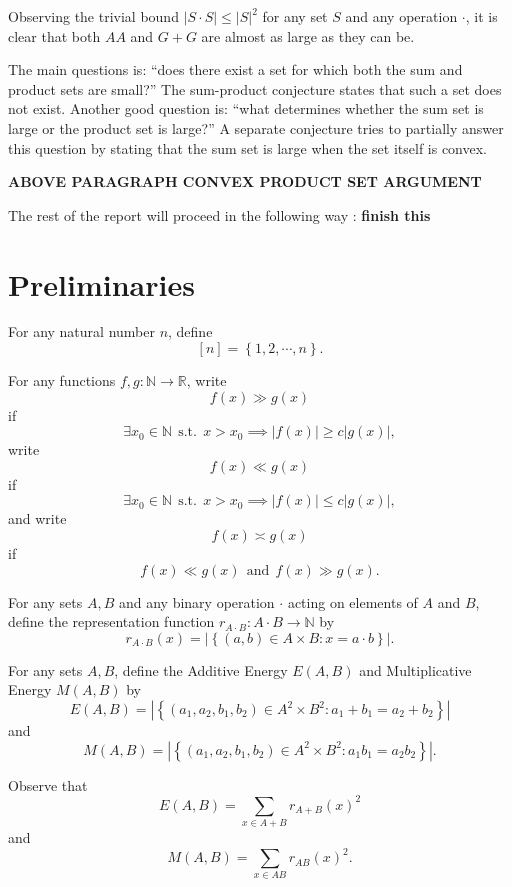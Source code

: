 \documentclass[12pt]{amsart}
\begin{document}
Observing the trivial bound \(\left\lvert S \cdot S \right\rvert \leq \left\lvert S \right\rvert ^{2}\) for any set \(S\) and any
operation \(\cdot \), it is clear that both \(AA\) and \(G +G\) are almost as large as they can be.

The main questions is: ``does there exist a set for which both the sum and product sets are small?''
The sum-product conjecture states that such a set does not exist. Another good question is: ``what
determines whether the sum set is large or the product set is large?'' A separate
conjecture tries to partially answer this question by stating that the sum set is large
when the set itself is convex.

\textbf{ABOVE PARAGRAPH CONVEX PRODUCT SET ARGUMENT}

The rest of the report will proceed in the following way : \textbf{finish this}

\section{Preliminaries}

For any natural number \(n\), define
\[
    [n] = \left\{ 1, 2 , \cdots , n \right\} 
.\]

For any functions \(f,g: \mathbb{N}  \to \mathbb{R} \), write
\[
    f(x) \gg g(x) 
\]
if
\[
    \exists x_0 \in \mathbb{N} ~~\text{s.t.}~~ x > x_0 \implies \left\lvert f(x) \right\rvert \geq c \left\lvert g(x) \right\rvert  
,\]
write
\[
    f(x) \ll g(x) 
\]
if
\[
    \exists x_0 \in \mathbb{N} ~~\text{s.t.}~~ x > x_0 \implies \left\lvert f(x) \right\rvert \leq c \left\lvert g(x) \right\rvert 
,\]
and write
\[
    f(x) \asymp g(x)
\]
if
\[
    f(x) \ll g(x) ~ ~ \text{and} ~ ~ f(x) \gg g(x)
.\]

For any sets \(A,B\) and any binary operation \(\cdot \) acting on elements of \(A\) and \(B\), define the representation function
\(r_{A \cdot B} : A \cdot B \to \mathbb{N} \) by
\[
    r_{A \cdot B} (x) = \left\lvert \left\{ (a,b)\in  A \times B : x = a \cdot b \right\}  \right\rvert
.\]

For any sets \(A,B\), define the Additive Energy \(E(A,B)\) and Multiplicative Energy \(M(A,B)\) by
\[
    E(A,B) = \left\lvert \left\{ (a_1,a_2,b_1,b_2) \in A^{2} \times B^{2} : a_1 + b_1 = a_2 + b_2 \right\}  \right\rvert 
\]
and
\[
    M(A,B) = \left\lvert \left\{ (a_1,a_2,b_1,b_2)\in  A^{2} \times B^{2} : a_1b_1 = a_2b_2 \right\}  \right\rvert
.\]

Observe that
\[
    E(A,B) = \sum _{x \in A + B} r_{A+B} (x)^{2}
\]
and
\[
    M(A,B) = \sum _{x \in AB} r_{AB} (x)^{2} 
.\]
\end{document}

